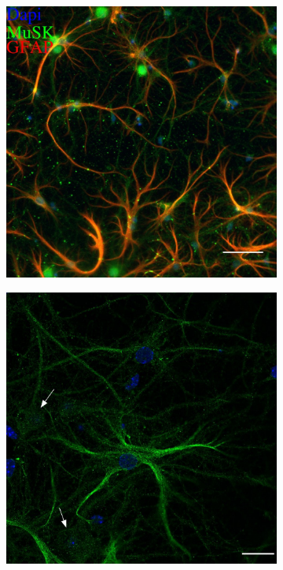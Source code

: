 \begin{figure}
\begin{subfigure}[h]{0.329\textwidth}
		\end{subfigure}
		\begin{subfigure}[h]{0.329\textwidth}
			\caption{}
			\label{fig:CultureMGgfapmusk}
			\includegraphics[width=\textwidth]{./Images/Immuno/Musk/Cultures/GFAP-MuSK_50um.jpg}
		\end{subfigure}
		\begin{subfigure}[h]{0.329\textwidth}
			\caption{}
			\label{fig:CultureMMmusk}
			\includegraphics[width=\textwidth]{./Images/Immuno/Musk/Cultures/MuSK_20um.jpg}

\end{subfigure}
\end{figure}
